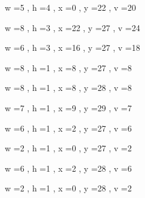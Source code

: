 \documentclass[11pt]{article}
\begin{document}
w =5 , h =4 , x =0 , y =22 , v =20
\par
w =8 , h =3 , x =22 , y =27 , v =24
\par
w =6 , h =3 , x =16 , y =27 , v =18
\par
w =8 , h =1 , x =8 , y =27 , v =8
\par
w =8 , h =1 , x =8 , y =28 , v =8
\par
w =7 , h =1 , x =9 , y =29 , v =7
\par
w =6 , h =1 , x =2 , y =27 , v =6
\par
w =2 , h =1 , x =0 , y =27 , v =2
\par
w =6 , h =1 , x =2 , y =28 , v =6
\par
w =2 , h =1 , x =0 , y =28 , v =2
\par
\newpage
\end{document}

